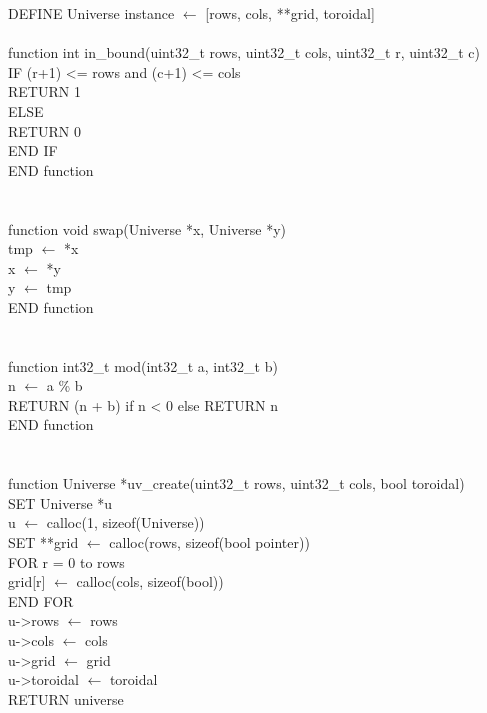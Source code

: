 \documentclass[12pt]{article}
\begin{document}
DEFINE Universe instance $\leftarrow$ [rows, cols, **grid, toroidal] \\
\\
function int in\_bound(uint32\_t rows, uint32\_t cols, uint32\_t r, uint32\_t c) \\
\indent IF (r+1) <= rows and (c+1) <= cols \\
\indent \indent RETURN 1 \\
\indent ELSE \\
\indent \indent RETURN 0 \\
\indent END IF \\
END function \\
\\
\\
function void swap(Universe *x, Universe *y) \\
\indent tmp $\leftarrow$ *x \\
\indent *x $\leftarrow$ *y \\
\indent *y $\leftarrow$ tmp \\
END function \\
\\
\\
function int32\_t mod(int32\_t a, int32\_t b) \\
\indent n $\leftarrow$ a \% b \\
\indent RETURN (n + b) if n < 0 else RETURN n \\
END function \\
\\
\\
function Universe *uv\_create(uint32\_t rows, uint32\_t cols, bool toroidal) \\
\indent SET Universe *u \\
\indent u $\leftarrow$ calloc(1, sizeof(Universe)) \\
\indent SET **grid $\leftarrow$ calloc(rows, sizeof(bool pointer)) \\
\indent FOR r = 0 to rows \\
\indent \indent grid[r] $\leftarrow$ calloc(cols, sizeof(bool)) \\
\indent END FOR \\
\indent u->rows $\leftarrow$ rows \\
\indent u->cols $\leftarrow$ cols \\
\indent u->grid $\leftarrow$ grid \\
\indent u->toroidal $\leftarrow$ toroidal \\
\indent RETURN universe \\
\end{document}
